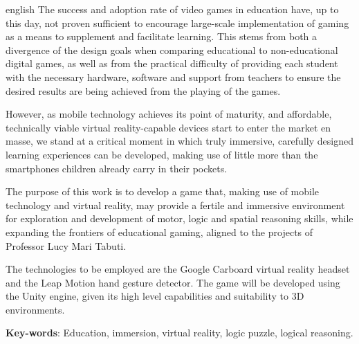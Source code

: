 \begin{resumo}[Abstract]
 \begin{otherlanguage*}{english}
   The success and adoption rate of video games in education 
   have, up to this day, not proven sufficient to encourage 
   large-scale implementation of gaming as a means to 
   supplement and facilitate learning. This stems from 
   both a divergence of the design goals when comparing 
   educational to non-educational digital games, as well 
   as from the practical difficulty of providing each student 
   with the necessary hardware, software and support from 
   teachers to ensure the desired results are being achieved 
   from the playing of the games.
   
   However, as mobile technology achieves its point of 
   maturity, and affordable, technically viable virtual 
   reality-capable devices start to enter the market en 
   masse, we stand at a critical moment in which truly 
   immersive, carefully designed learning experiences 
   can be developed, making use of little more than the 
   smartphones children already carry in their pockets.
   
   The purpose of this work is to develop a game that, 
   making use of mobile technology and virtual reality, 
   may provide a fertile and immersive environment for 
   exploration and development of motor, logic and spatial 
   reasoning skills, while expanding the frontiers of 
   educational gaming, aligned to the projects of 
   Professor Lucy Mari Tabuti.
   
   The technologies to be employed are the 
   Google Carboard virtual reality headset and the 
   Leap Motion hand gesture detector. The game will be 
   developed using the Unity engine, given its high level 
   capabilities and suitability to 3D environments.

    \vspace{\onelineskip}

    \noindent
    \textbf{Key-words}: Education, immersion, virtual reality, logic puzzle, logical reasoning.
  \end{otherlanguage*}
\end{resumo}